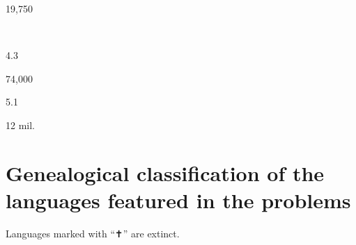 \begin{description}[font=\normalfont,style=nextline]
\begin{multicols}{2}
\begin{description}[font=\normalfont\itshape,noitemsep]
 \item[]
 \item[]
\item[\nativespeakers] 19,750 
 \item[\region] \regionWSWAlaska\ \Brackets{\regionUSA}
 \end{description}\end{multicols}
\item[\langnameZoque] 
 \begin{multicols}{2}\begin{description}[font=\normalfont\itshape,noitemsep] 
 \item[] 
 \item[\pbnumberabbr] 4.3 
 \item[\family] \famMixeZoquean 
 \item[]
\item[\nativespeakers] 74,000 
 \item[\region] \regionMexico 
 \end{description}\end{multicols}
\item[\langnameZulu] 
 \begin{multicols}{2}\begin{description}[font=\normalfont\itshape,noitemsep] 
 \item[] 
 \item[\pbnumberabbr] 5.1 
 \item[\family] \famNigerCongo 
 \item[]
\item[\nativespeakers] 12 mil. 
 \item[\region] \regionSouthAfrica\EnumComma\regionLesotho 
 \end{description}\end{multicols}
\end{description}



\chapter{Genealogical classification of the languages featured in the problems} 
\label{appendix:2}
Languages marked with “✝” are extinct.

